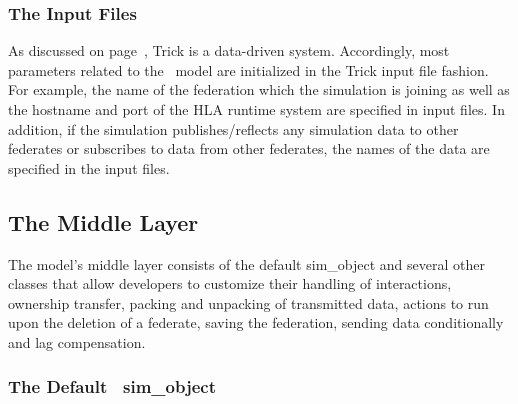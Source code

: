 \subsubsection{The Input Files}

As discussed on page~\pageref{sec:data-driven-mechanisms},
Trick is a data-driven system. 
Accordingly, most parameters related to the \TrickHLA\ model are initialized 
in the Trick input file fashion.
For example, the name of the federation which the simulation is joining as well as
the hostname and port of the HLA runtime system are specified in input files.
In addition, if the simulation publishes/reflects any simulation data to other federates
or subscribes to data from other federates,
the names of the data are specified in the input files.

\subsection{The Middle Layer}

The model's middle layer consists of the default {\ttfamily sim\_object} and
several other classes that allow developers to customize their handling of 
interactions, ownership transfer, packing and unpacking of transmitted data, 
actions to run upon the deletion of a federate, saving the federation, sending
data conditionally and lag compensation.

\subsubsection{The Default \TrickHLA\ {\ttfamily sim\_object}}

